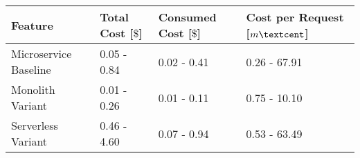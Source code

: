 \begin{tabular}{llll}
\toprule
Feature & Total Cost [$\$$] & Consumed Cost [$\$$] & Cost per Request [$m\textcent$] \\
\midrule
Microservice Baseline & 0.05 - 0.84 & 0.02 - 0.41 & 0.26 - 67.91 \\
Monolith Variant & 0.01 - 0.26 & 0.01 - 0.11 & 0.75 - 10.10 \\
Serverless Variant & 0.46 - 4.60 & 0.07 - 0.94 & 0.53 - 63.49 \\
\bottomrule
\end{tabular}
